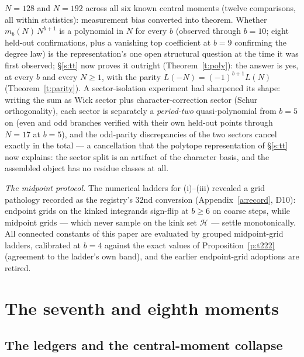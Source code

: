 \documentclass[11pt]{article}
\numberwithin{equation}{section}
\theoremstyle{definition}
\theoremstyle{remark}
\begin{document}
$N=128$ and $N=192$ across all six known central moments
(twelve comparisons, all within statistics): measurement bias
converted into theorem. Whether $m_b(N)\,N^{b+1}$ is a
polynomial in $N$ for every $b$ (observed through $b=10$;
eight held-out confirmations, plus a vanishing top coefficient
at $b=9$ confirming the degree law) is the representation's
one open structural question at the time it was first
observed; \S\ref{s:tt} now proves it outright
(Theorem~\ref{t:poly}): the answer is yes, at every $b$ and
every $N\ge1$, with the parity
$L(-N)=(-1)^{b+1}L(N)$ (Theorem~\ref{t:parity}). A
sector-isolation experiment had sharpened its shape: writing
the sum as Wick sector plus character-correction sector (Schur
orthogonality), each sector is separately a \emph{period-two}
quasi-polynomial from $b=5$ on (even and odd branches verified
with their own held-out points through $N=17$ at $b=5$), and
the odd-parity discrepancies of the two sectors cancel exactly
in the total --- a cancellation that the polytope
representation of \S\ref{s:tt} now explains: the sector split
is an artifact of the character basis, and the assembled
object has no residue classes at all.

\emph{The midpoint protocol.} The numerical ladders for
(i)--(iii) revealed a grid pathology recorded as the registry's
$32$nd conversion (Appendix~\ref{a:record}, D10): endpoint
grids on the kinked integrands sign-flip at $b\ge6$ on coarse
steps, while midpoint grids --- which never sample on the kink
set $\mathcal H$ --- settle monotonically. All connected
constants of this paper are evaluated by grouped midpoint-grid
ladders, calibrated at $b=4$ against the exact values of
Proposition~\ref{p:t222} (agreement to the ladder's own band),
and the earlier endpoint-grid adoptions are retired.

\section{The seventh and eighth moments}\label{s:seven}

\subsection{The ledgers and the central-moment
collapse}\label{s:seven:ledger}
\end{document}
